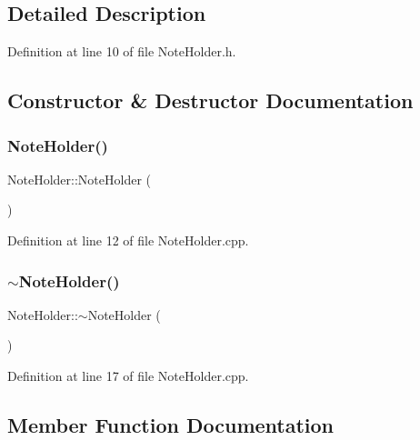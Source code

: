 \subsection{Detailed Description}


Definition at line 10 of file Note\+Holder.\+h.



\subsection{Constructor \& Destructor Documentation}
\hypertarget{classNoteHolder_a8a6d0e272ccfe8f56534c646b8c5e92c}{}\label{classNoteHolder_a8a6d0e272ccfe8f56534c646b8c5e92c} 
\subsubsection{\texorpdfstring{Note\+Holder()}{NoteHolder()}}
{\footnotesize\ttfamily Note\+Holder\+::\+Note\+Holder (\begin{DoxyParamCaption}{ }\end{DoxyParamCaption})}



Definition at line 12 of file Note\+Holder.\+cpp.

\hypertarget{classNoteHolder_afaeb3c127fbbc30d03b69e2cb0f15f2a}{}\label{classNoteHolder_afaeb3c127fbbc30d03b69e2cb0f15f2a} 
\subsubsection{\texorpdfstring{$\sim$\+Note\+Holder()}{~NoteHolder()}}
{\footnotesize\ttfamily Note\+Holder\+::$\sim$\+Note\+Holder (\begin{DoxyParamCaption}{ }\end{DoxyParamCaption})}



Definition at line 17 of file Note\+Holder.\+cpp.



\subsection{Member Function Documentation}
\hypertarget{classNoteHolder_a9fbdbdf5cc2628f360c45eb861eacded}{}\label{classNoteHolder_a9fbdbdf5cc2628f360c45eb861eacded} 
